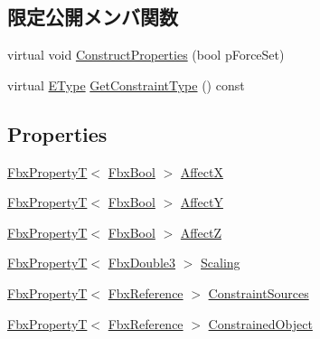 \subsection*{限定公開メンバ関数}
\begin{DoxyCompactItemize}
\item 
virtual void \hyperlink{class_fbx_constraint_scale_af34ea4ce8516d69aefbcb9e83060b2c1}{Construct\+Properties} (bool p\+Force\+Set)
\item 
virtual \hyperlink{class_fbx_constraint_a49c1634663395eab7c28856df233ec66}{E\+Type} \hyperlink{class_fbx_constraint_scale_a7eb92c352d4a4bd3c0754dd4e53fa6e4}{Get\+Constraint\+Type} () const
\end{DoxyCompactItemize}
\subsection*{Properties}
\begin{DoxyCompactItemize}
\item 
\hyperlink{class_fbx_property_t}{Fbx\+PropertyT}$<$ \hyperlink{fbxtypes_8h_a92e0562b2fe33e76a242f498b362262e}{Fbx\+Bool} $>$ \hyperlink{class_fbx_constraint_scale_a41d95ab4643d154a400efa926062ffac}{AffectX}
\item 
\hyperlink{class_fbx_property_t}{Fbx\+PropertyT}$<$ \hyperlink{fbxtypes_8h_a92e0562b2fe33e76a242f498b362262e}{Fbx\+Bool} $>$ \hyperlink{class_fbx_constraint_scale_a2249bbb0bd5ba9507fa82e1b66c0b2a2}{AffectY}
\item 
\hyperlink{class_fbx_property_t}{Fbx\+PropertyT}$<$ \hyperlink{fbxtypes_8h_a92e0562b2fe33e76a242f498b362262e}{Fbx\+Bool} $>$ \hyperlink{class_fbx_constraint_scale_af8cc6e516ff4b87331fc12f20af6f235}{AffectZ}
\item 
\hyperlink{class_fbx_property_t}{Fbx\+PropertyT}$<$ \hyperlink{fbxtypes_8h_ae0a96f14cde566774c7553aa7523b7a7}{Fbx\+Double3} $>$ \hyperlink{class_fbx_constraint_scale_a0c8bd160ee16da64bf998a612bb11a5b}{Scaling}
\item 
\hyperlink{class_fbx_property_t}{Fbx\+PropertyT}$<$ \hyperlink{fbxtypes_8h_a44df6a2eec915cf27cd481e5c5e48a24}{Fbx\+Reference} $>$ \hyperlink{class_fbx_constraint_scale_a434954eedd1e80d6935881b37e9da11f}{Constraint\+Sources}
\item 
\hyperlink{class_fbx_property_t}{Fbx\+PropertyT}$<$ \hyperlink{fbxtypes_8h_a44df6a2eec915cf27cd481e5c5e48a24}{Fbx\+Reference} $>$ \hyperlink{class_fbx_constraint_scale_ae5eb43970ba98186d43fdb51498b21c5}{Constrained\+Object}
\end{DoxyCompactItemize}
